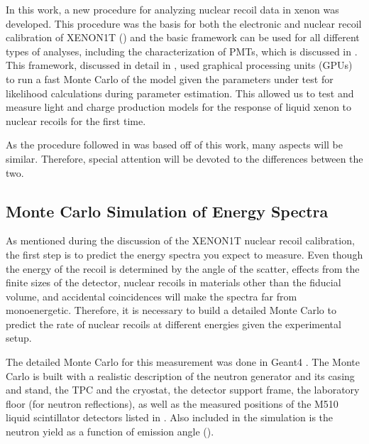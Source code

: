 In this work, a new procedure for analyzing nuclear recoil data in xenon was developed.  This procedure was the basis for both the electronic and nuclear recoil calibration of XENON1T () and the basic framework can be used for all different types of analyses, including the characterization of PMTs, which is discussed in .  This framework, discussed in detail in , used graphical processing units (GPUs) to run a fast Monte Carlo of the model given the parameters under test for likelihood calculations during parameter estimation.  This allowed us to test and measure light and charge production models for the response of liquid xenon to nuclear recoils for the first time.   

As the procedure followed in  was based off of this work, many aspects will be similar.  Therefore, special attention will be devoted to the differences between the two.



\subsection{Monte Carlo Simulation of Energy Spectra}
\label{sec:nerix_geant_mc}


As mentioned during the discussion of the XENON1T nuclear recoil calibration, the first step is to predict the energy spectra you expect to measure.  Even though the energy of the recoil is determined by the angle of the scatter, effects from the finite sizes of the detector, nuclear recoils in materials other than the fiducial volume, and accidental coincidences will make the spectra far from monoenergetic.  Therefore, it is necessary to build a detailed Monte Carlo to predict the rate of nuclear recoils at different energies given the experimental setup.

The detailed Monte Carlo for this measurement was done in Geant4 \cite{agostinelli2003geant4}.  The Monte Carlo is built with a realistic description of the neutron generator and its casing and stand, the TPC and the cryostat, the detector support frame, the laboratory floor (for neutron reflections), as well as the measured positions of the M510 liquid scintillator detectors listed in .  Also included in the simulation is the neutron yield as a function of emission angle ().

